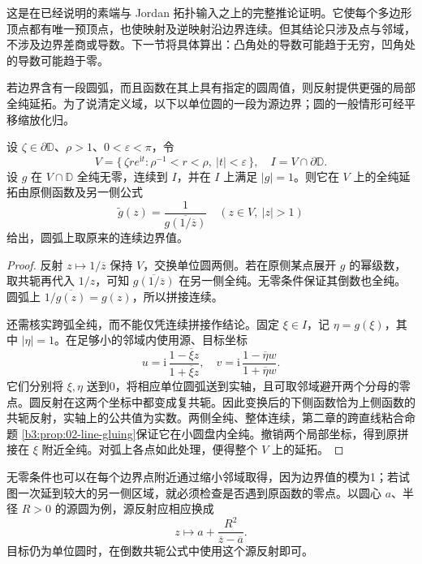 这是在已经说明的素端与 Jordan 拓扑输入之上的完整推论证明。它使每个多边形顶点都有唯一预顶点，也使映射及逆映射沿边界连续。但其结论只涉及点与邻域，不涉及边界差商或导数。下一节将具体算出：凸角处的导数可能趋于无穷，凹角处的导数可能趋于零。

\ProseParagraphBreak

若边界含有一段圆弧，而且函数在其上具有指定的圆周值，则反射提供更强的局部全纯延拓。为了说清定义域，以下以单位圆的一段为源边界；圆的一般情形可经平移缩放化归。

\begin{proposition}[圆边反射的局部形式]\label{b3:prop:07-circle-reflection}
设 \(\zeta\in\partial\mathbb D\)、\(\rho>1\)、\(0<\varepsilon<\pi\)，令
\[
 V=\{\,\zeta r e^{\mathrm i t}:\rho^{-1}<r<\rho,\ |t|<\varepsilon\,\},
 \quad I=V\cap\partial\mathbb D.
\]
设 \(g\) 在 \(V\cap\mathbb D\) 全纯无零，连续到 \(I\)，并在 \(I\) 上满足 \(|g|=1\)。则它在 \(V\) 上的全纯延拓由原侧函数及另一侧公式
\[
 \widetilde g(z)=\frac1{\overline{g(1/\overline z)}}
 \quad(z\in V,\ |z|>1)
\]
给出，圆弧上取原来的连续边界值。
\end{proposition}
\begin{proof}
反射 \(z\mapsto1/\overline z\) 保持 \(V\)，交换单位圆两侧。若在原侧某点展开 \(g\) 的幂级数，取共轭再代入 \(1/z\)，可知 \(\overline{g(1/\overline z)}\) 在另一侧全纯。无零条件保证其倒数也全纯。圆弧上
\(1/\overline{g(z)}=g(z)\)，所以拼接连续。

还需核实跨弧全纯，而不能仅凭连续拼接作结论。固定 \(\xi\in I\)，记 \(\eta=g(\xi)\)，其中 \(|\eta|=1\)。在足够小的邻域内使用源、目标坐标
\[
 u=\mathrm i\,\frac{1-\overline\xi z}{1+\overline\xi z},
 \quad v=\mathrm i\,\frac{1-\overline\eta w}{1+\overline\eta w}.
\]
它们分别将 \(\xi,\eta\) 送到0，将相应单位圆弧送到实轴，且可取邻域避开两个分母的零点。圆反射在这两个坐标中都变成复共轭。因此变换后的下侧函数恰为上侧函数的共轭反射，实轴上的公共值为实数。两侧全纯、整体连续，第二章的跨直线粘合命题 \cref{b3:prop:02-line-gluing}保证它在小圆盘内全纯。撤销两个局部坐标，得到原拼接在 \(\xi\) 附近全纯。对弧上各点如此处理，便得整个 \(V\) 上的延拓。
\end{proof}

无零条件也可以在每个边界点附近通过缩小邻域取得，因为边界值的模为1；若试图一次延到较大的另一侧区域，就必须检查是否遇到原函数的零点。以圆心 \(a\)、半径 \(R>0\) 的源圆为例，源反射应相应换成
\[
 z\longmapsto a+\frac{R^2}{\overline z-\overline a}.
\]
目标仍为单位圆时，在倒数共轭公式中使用这个源反射即可。

\ProseParagraphBreak

